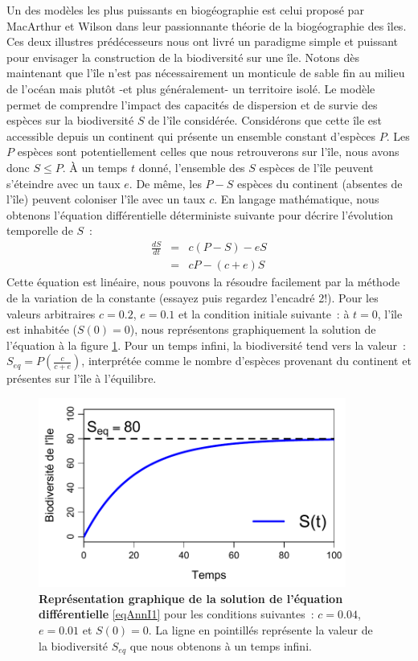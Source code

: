Un des modèles les plus puissants en biogéographie est celui proposé par MacArthur et Wilson dans leur passionnante théorie de la biogéographie des îles. Ces deux illustres prédécesseurs nous ont livré un paradigme simple et puissant pour envisager la construction de la biodiversité sur une île. Notons dès maintenant que l'île n'est pas nécessairement un monticule de sable fin au milieu de l'océan mais plutôt -et plus généralement- un territoire isolé. Le modèle permet de comprendre l'impact des capacités de dispersion et de survie des espèces sur la biodiversité $S$ de l'île considérée. Considérons que cette île est accessible depuis un continent qui présente un ensemble constant d'espèces $P$. Les $P$ espèces sont potentiellement celles que nous retrouverons sur l'île, nous avons donc $S\leqslant P$. À un temps $t$ donné, l'ensemble des $S$ espèces de l'île peuvent s'éteindre avec un taux $e$. De même, les $P-S$ espèces du continent (absentes de l'île) peuvent coloniser l'île avec un taux $c$. En langage mathématique, nous obtenons l'équation différentielle déterministe suivante pour décrire l'évolution temporelle de $S$~:
\begin{eqnarray}
\nonumber \frac{dS}{dt}&=&c(P-S)-eS\\
\label{eqAnnI1} &=&cP-(c+e)S
\end{eqnarray}
Cette équation est linéaire, nous pouvons la résoudre facilement par la méthode de la variation de la constante (essayez puis regardez l'encadré 2!). Pour les valeurs arbitraires $c=0.2$, $e=0.1$ et la condition initiale suivante~: à $t=0$, l'île est inhabitée ($S(0)=0$), nous représentons graphiquement la solution de l'équation à la figure \ref{figAnnI1}. Pour un temps infini, la biodiversité tend vers la valeur~: $S_{eq}=P\left(\frac{c}{c+e}\right)$, interprétée comme le nombre d'espèces provenant du continent et présentes sur l'île à l'équilibre.

\begin{figure}[h!]
\centering
\includegraphics[width=0.9\textwidth]{annexe1/fig/figAnnI1.pdf}
\caption[Représentation graphique de la solution de l'équation différentielle]{\textbf{Représentation graphique de la solution de l'équation différentielle} \eqref{eqAnnI1} pour les conditions suivantes~: $c=0.04$, $e=0.01$ et $S(0)=0$. La ligne en pointillés représente la valeur de la biodiversité $S_{eq}$ que nous obtenons à un temps infini.}
\label{figAnnI1}
\end{figure}




